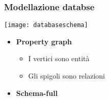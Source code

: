 \begin{frame}
\frametitle{Modellazione databse}
\begin{minipage}[t][0.4\textheight][t]{\textwidth}
\texttt{[image: databaseschema]}
\end{minipage}
\begin{minipage}[b][0.6\textheight][t]{\textwidth}
   \begin{itemize}
	\item \textbf{Property graph}
	\begin{itemize}
		\item I vertici sono entità
		\item Gli spigoli sono relazioni
	\end{itemize}	 
    \item \textbf{Schema-full}
   \end{itemize}
\end{minipage}
\end{frame}